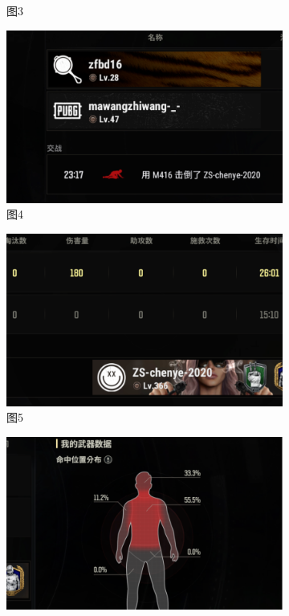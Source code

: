 \documentclass[12pt, a4paper, oneside]{ctexart}
\begin{document}
\begin{figure}[htbp]
\begin{subfigure}{0.3\textwidth}
        \caption{图3}
    \end{subfigure}

    \medskip %

    \begin{subfigure}{0.3\textwidth}
        \centering
        \includegraphics[width=\textwidth]{fig/4.png} %
        \caption{图4}
    \end{subfigure}
    \hfill
    \begin{subfigure}{0.3\textwidth}
        \centering
        \includegraphics[width=\textwidth]{fig/5.png} %
        \caption{图5}
    \end{subfigure}
    \hfill
    \begin{subfigure}{0.3\textwidth}
        \centering
        \includegraphics[width=\textwidth]{fig/6.png} %

\end{subfigure}
\end{figure}
\end{document}
